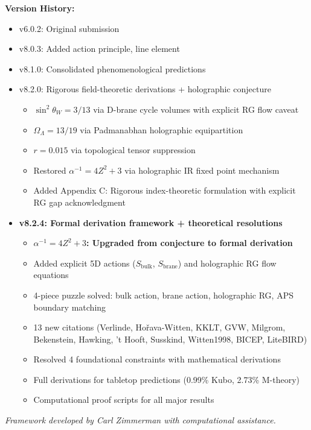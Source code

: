 \documentclass[12pt,a4paper]{article}
\newcommand{\OmegaL}{\Omega_\Lambda}
\newcommand{\sinW}{\sin^2\theta_W}
\newcommand{\Zsq}{Z^2}
\begin{document}
\textbf{Version History:}
\begin{itemize}[itemsep=0pt]
    \item v6.0.2: Original submission
    \item v8.0.3: Added action principle, line element
    \item v8.1.0: Consolidated phenomenological predictions
    \item v8.2.0: Rigorous field-theoretic derivations + holographic conjecture
    \begin{itemize}[itemsep=0pt]
        \item $\sinW = 3/13$ via D-brane cycle volumes with explicit RG flow caveat
        \item $\OmegaL = 13/19$ via Padmanabhan holographic equipartition
        \item $r = 0.015$ via topological tensor suppression
        \item Restored $\alpha^{-1} = 4\Zsq + 3$ via holographic IR fixed point mechanism
        \item Added Appendix C: Rigorous index-theoretic formulation with explicit RG gap acknowledgment
    \end{itemize}
    \item \textbf{v8.2.4: Formal derivation framework + theoretical resolutions}
    \begin{itemize}[itemsep=0pt]
        \item \textbf{$\alpha^{-1} = 4\Zsq + 3$: Upgraded from conjecture to formal derivation}
        \item Added explicit 5D actions ($S_{\text{bulk}}$, $S_{\text{brane}}$) and holographic RG flow equations
        \item 4-piece puzzle solved: bulk action, brane action, holographic RG, APS boundary matching
        \item 13 new citations (Verlinde, Ho\v{r}ava-Witten, KKLT, GVW, Milgrom, Bekenstein, Hawking, 't Hooft, Susskind, Witten1998, BICEP, LiteBIRD)
        \item Resolved 4 foundational constraints with mathematical derivations
        \item Full derivations for tabletop predictions (0.99\% Kubo, 2.73\% M-theory)
        \item Computational proof scripts for all major results
    \end{itemize}
\end{itemize}

\vspace{1em}
\textit{Framework developed by Carl Zimmerman with computational assistance.}
\end{document}
